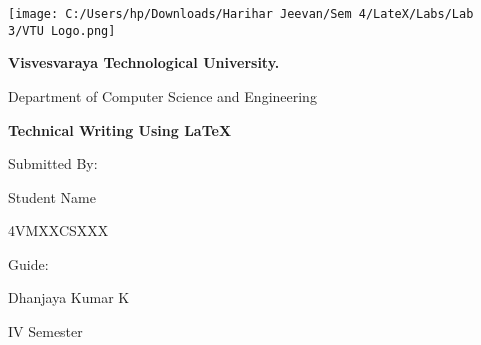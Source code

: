 \documentclass{article}
\begin{document}
	\begin{center}
		\centering
		\texttt{[image: C:/Users/hp/Downloads/Harihar Jeevan/Sem 4/LateX/Labs/Lab 3/VTU Logo.png]}\par
		{\Large\textbf{Visvesvaraya Technological University.}\par}
		\vspace{1cm}
		{\Large{Department of Computer Science and Engineering}\par}
		\vspace{2cm}
		{\Huge\textbf{Technical Writing Using LaTeX}\par}
		\vspace{2cm}
		{\Large{Submitted By:}\par}
		{\large{Student Name}\par}
		{\large{4VMXXCSXXX}\par}
		\vspace{2cm}
		{\Large{Guide:}\par}
		{\large{Dhanjaya Kumar K}\par}
		\vfill
		{\large{IV Semester}\par}
	\end{center}
\end{document}
